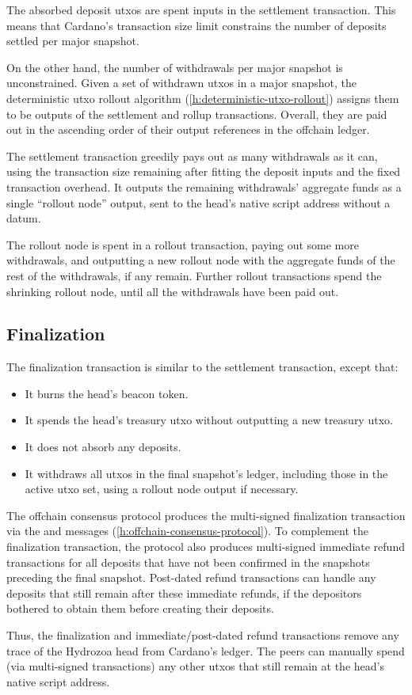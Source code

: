 \documentclass[../hydrozoa.tex]{subfiles}
\begin{document}
The absorbed deposit utxos are spent inputs in the settlement transaction.
This means that Cardano's transaction size limit constrains the number of deposits settled per major snapshot.

On the other hand, the number of withdrawals per major snapshot is unconstrained.
Given a set of withdrawn utxos in a major snapshot, the deterministic utxo rollout algorithm (\cref{h:deterministic-utxo-rollout}) assigns them to be outputs of the settlement and rollup transactions.
Overall, they are paid out in the ascending order of their output references in the offchain ledger.

The settlement transaction greedily pays out as many withdrawals as it can, using the transaction size remaining after fitting the deposit inputs and the fixed transaction overhead.
It outputs the remaining withdrawals' aggregate funds as a single ``rollout node'' output, sent to the head's native script address without a datum.

The rollout node is spent in a rollout transaction, paying out some more withdrawals, and outputting a new rollout node with the aggregate funds of the rest of the withdrawals, if any remain.
Further rollout transactions spend the shrinking rollout node, until all the withdrawals have been paid out.

\subsection{Finalization}%
\label{h:multisig-finalize}
The finalization transaction is similar to the settlement transaction, except that:
\begin{itemize}
  \item It burns the head's beacon token.
  \item It spends the head's treasury utxo without outputting a new treasury utxo.
  \item It does not absorb any deposits.
  \item It withdraws all utxos in the final snapshot's ledger, including those in the active utxo set, using a rollout node output if necessary.
\end{itemize}

The offchain consensus protocol produces the multi-signed finalization transaction via the  and  messages (\cref{h:offchain-consensus-protocol}).
To complement the finalization transaction, the protocol also produces multi-signed immediate refund transactions for all deposits that have not been confirmed in the snapshots preceding the final snapshot.
Post-dated refund transactions can handle any deposits that still remain after these immediate refunds, if the depositors bothered to obtain them before creating their deposits.

Thus, the finalization and immediate/post-dated refund transactions remove any trace of the Hydrozoa head from Cardano's ledger.
The peers can manually spend (via multi-signed transactions) any other utxos that still remain at the head's native script address.
\end{document}
